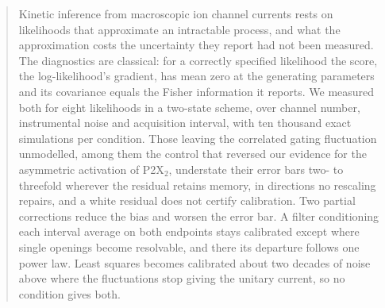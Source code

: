 \begin{abstract}
Kinetic inference from macroscopic ion channel currents rests on likelihoods that approximate an intractable process, and what the approximation costs the uncertainty they report had not been measured. The diagnostics are classical: for a correctly specified likelihood the score, the log-likelihood's gradient, has mean zero at the generating parameters and its covariance equals the Fisher information it reports. We measured both for eight likelihoods in a two-state scheme, over channel number, instrumental noise and acquisition interval, with ten thousand exact simulations per condition. Those leaving the correlated gating fluctuation unmodelled, among them the control that reversed our evidence for the asymmetric activation of P2X$_2$, understate their error bars two- to threefold wherever the residual retains memory, in directions no rescaling repairs, and a white residual does not certify calibration. Two partial corrections reduce the bias and worsen the error bar. A filter conditioning each interval average on both endpoints stays calibrated except where single openings become resolvable, and there its departure follows one power law. Least squares becomes calibrated about two decades of noise above where the fluctuations stop giving the unitary current, so no condition gives both.
\end{abstract}
